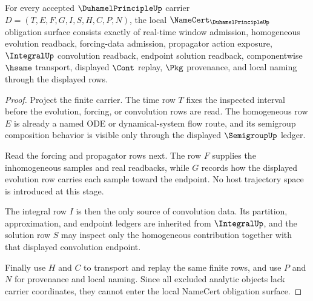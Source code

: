 \begin{theorem}
\label{thm:duhamel-principle-namecert-obligations}
For every accepted $\DuhamelPrincipleUp$ carrier $D=(T,E,F,G,I,S,H,C,P,N)$, the local $\NameCert_{\DuhamelPrincipleUp}$ obligation surface consists exactly of real-time window admission, homogeneous evolution readback, forcing-data admission, propagator action exposure, $\IntegralUp$ convolution readback, endpoint solution readback, componentwise $\hsame$ transport, displayed $\Cont$ replay, $\Pkg$ provenance, and local naming through the displayed rows.
\end{theorem}
\begin{proof}
Project the finite carrier. The time row $T$ fixes the inspected interval before the evolution, forcing, or convolution rows are read. The homogeneous row $E$ is already a named ODE or dynamical-system flow route, and its semigroup composition behavior is visible only through the displayed $\SemigroupUp$ ledger.

Read the forcing and propagator rows next. The row $F$ supplies the inhomogeneous samples and real readbacks, while $G$ records how the displayed evolution row carries each sample toward the endpoint. No host trajectory space is introduced at this stage.

The integral row $I$ is then the only source of convolution data. Its partition, approximation, and endpoint ledgers are inherited from $\IntegralUp$, and the solution row $S$ may inspect only the homogeneous contribution together with that displayed convolution endpoint.

Finally use $H$ and $C$ to transport and replay the same finite rows, and use $P$ and $N$ for provenance and local naming. Since all excluded analytic objects lack carrier coordinates, they cannot enter the local NameCert obligation surface.
\end{proof}

